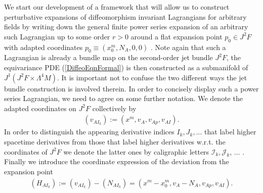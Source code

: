 \documentclass[a4paper,12pt, DIV=14, BCOR=5mm, twoside, headsepline, numbers=noenddot]{scrbook}
\begin{document}
We start our development of a framework that will allow us to construct perturbative expansions of diffeomorphism invariant Lagrangians for arbitrary fields by writing down the general finite power series expansion of an arbitrary such Lagrangian up to some order $r > 0$ around a flat expansion point $p_0 \in J^2F$ with adapted coordinates $p_0 \equiv (x_0^m,N_A, 0, 0)$ . Note again that such a Lagrangian is already a bundle map on the second-order jet bundle $J^2F$, the equivariance PDE (\ref{DiffeoEqnFormal}) is then constructed as a submanifold of $J^1(J^2F \times \Lambda^4M)$. It is important not to confuse the two different ways the jet bundle construction is involved therein. In order to concisely display such a power series Lagrangian, we need to agree on some further notation. We denote the adapted coordinates on $J^2F$ collectively by
\begin{align}
    (v_{AI_k}) := (x^m,v_A,v_{Ap},v_{AI}).
\end{align}
In order to distinguish the appearing derivative indices $I_k,J_k,...$ that label higher spacetime derivatives from those that label higher derivatives w.r.t. the coordinates of $J^2F$ we denote the latter ones by caligraphic letters
$\mathcal{I}_k, \mathcal{J}_k$, ... . Finally we introduce the coordinate expression of the deviation from the expansion point 
\begin{align}
    (H_{AI_k}) := (v_{AI_k}) - (N_{AI_k}) = (x^m-x_0^m,v_A-N_A,v_{Ap},v_{AI}).
\end{align}
\end{document}
